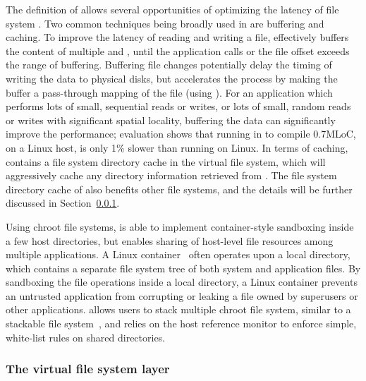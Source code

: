 The definition of \thehostabi{} allows several opportunities of optimizing the latency of file system \linuxapi{}.
Two common techniques being broadly used in \thelibos{}
are buffering and caching.
To improve the latency of reading and writing a file,
\thelibos{} effectively buffers the content of multiple  and  \linuxapis{},
until the application calls  or the file offset exceeds the range of buffering.
Buffering file changes potentially delay the timing of writing the data
to physical disks,
but \thelibos{} accelerates the process
by making the buffer a pass-through mapping of the file (using ).
For an application which
performs lots of small, sequential reads or writes,
or lots of small, random reads or writes with significant spatial locality,
buffering the data
can significantly improve the performance;
evaluation shows that
running  in \graphene{} to compile 0.7MLoC, on a Linux host, 
is only 1\% slower than running on Linux.
In terms of caching, \thelibos{} contains a file system directory cache
in the virtual file system,
which will aggressively cache any directory information
retrieved from \thehostabi{}.
The file system directory cache of \thelibos{} also benefits other file systems,
and the details will be further discussed in Section~\ref{sec:resource:fs:vfs}.



Using chroot file systems, \thelibos{} is able to implement container-style sandboxing inside a few host directories,
but enables sharing of host-level file resources
among multiple applications.
A Linux container~\cite{lxc-docker} often operates upon a local directory, which contains a separate file system tree of both system and application files.
By sandboxing the file operations %
inside a local directory,
a Linux container prevents an untrusted application from corrupting or leaking a file owned by superusers or other applications.
\thelibos{} allows users to stack multiple chroot file system,
similar to a stackable file system~\cite{aufs},
and relies on the host reference monitor to enforce simple, white-list rules
on shared directories.






\subsubsection{The virtual file system layer}
\label{sec:resource:fs:vfs}






